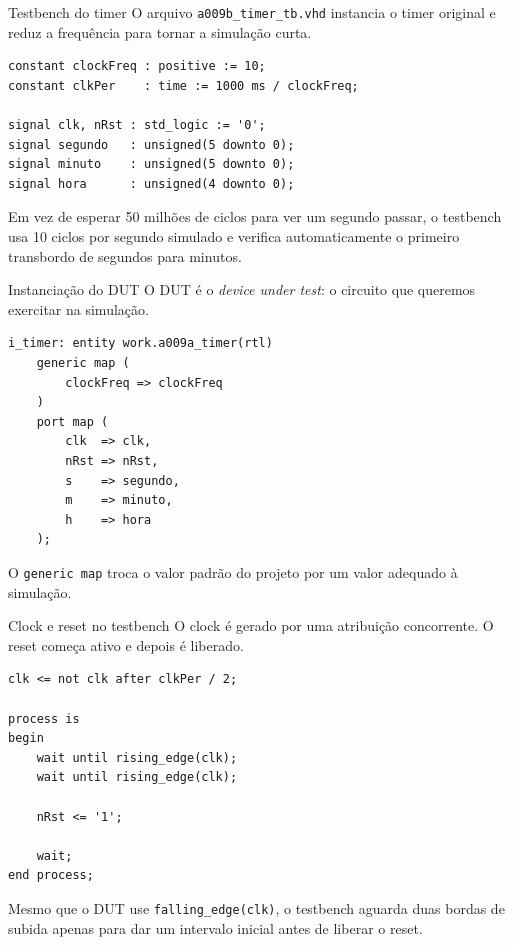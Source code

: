 \documentclass[aspectratio=169,11pt]{beamer}
\begin{document}
\begin{frame}[fragile]{Testbench do timer}
    O arquivo \texttt{a009b\_timer\_tb.vhd} instancia o timer original e reduz a frequência para tornar a simulação curta.

\begin{lstlisting}
constant clockFreq : positive := 10;
constant clkPer    : time := 1000 ms / clockFreq;

signal clk, nRst : std_logic := '0';
signal segundo   : unsigned(5 downto 0);
signal minuto    : unsigned(5 downto 0);
signal hora      : unsigned(4 downto 0);
\end{lstlisting}

    \vspace{0.4em}
    Em vez de esperar 50 milhões de ciclos para ver um segundo passar, o testbench usa 10 ciclos por segundo simulado e verifica automaticamente o primeiro transbordo de segundos para minutos.
\end{frame}

\begin{frame}[fragile]{Instanciação do DUT}
    O DUT é o \textit{device under test}: o circuito que queremos exercitar na simulação.

\begin{lstlisting}
i_timer: entity work.a009a_timer(rtl)
    generic map (
        clockFreq => clockFreq
    )
    port map (
        clk  => clk,
        nRst => nRst,
        s    => segundo,
        m    => minuto,
        h    => hora
    );
\end{lstlisting}

    \vspace{0.4em}
    O \texttt{generic map} troca o valor padrão do projeto por um valor adequado à simulação.
\end{frame}

\begin{frame}[fragile]{Clock e reset no testbench}
    O clock é gerado por uma atribuição concorrente. O reset começa ativo e depois é liberado.

\begin{lstlisting}
clk <= not clk after clkPer / 2;

process is
begin
    wait until rising_edge(clk);
    wait until rising_edge(clk);

    nRst <= '1';

    wait;
end process;
\end{lstlisting}

    \vspace{0.4em}
    Mesmo que o DUT use \texttt{falling\_edge(clk)}, o testbench aguarda duas bordas de subida apenas para dar um intervalo inicial antes de liberar o reset.
\end{frame}
\end{document}
